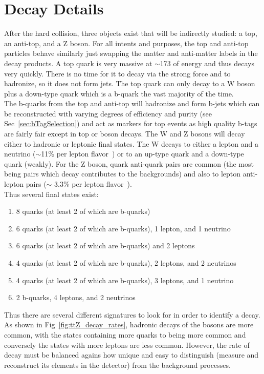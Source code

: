 	\section{\ttZ Decay Details}
	After the hard collision, three objects exist that will be indirectly studied: a top, an anti-top, and a Z boson. For all intents and purposes, the top and anti-top particles behave similarly just swapping the matter and anti-matter labels in the decay products. A top quark is very massive at $\sim$173 \GeV of energy and thus decays very quickly. There is no time for it to decay via the strong force and to hadronize, so it does not form jets. The top quark can only decay to a W boson plus a down-type quark which is a b-quark the vast majority of the time. \\
	
	The b-quarks from the top and anti-top will hadronize and form b-jets which can be reconstructed with varying degrees of efficiency and purity (see Sec~\ref{sec:bTagSelection}) and act as markers for top events as high quality b-tags are fairly fair except in top or boson decays. The W and Z bosons will decay either to hadronic or leptonic final states. The W decays to either a lepton and a neutrino ($\sim$11\% per lepton flavor~\cite{pdg}) or to an up-type quark and a down-type quark (weakly). For the Z boson, quark anti-quark pairs are common (the most being \bbbar pairs which decay contributes to the \ttZ backgrounds) and also to lepton anti-lepton pairs ($\sim$ 3.3\% per lepton flavor~\cite{pdg}).\\
	
	Thus several final states exist:
	\begin{enumerate}
	\item 8 quarks (at least 2 of which are b-quarks)
	\item 6 quarks (at least 2 of which are b-quarks), 1 lepton, and 1 neutrino
	\item 6 quarks (at least 2 of which are b-quarks) and 2 leptons
	\item 4 quarks (at least 2 of which are b-quarks), 2 leptons, and 2 neutrinos
	\item 4 quarks (at least 2 of which are b-quarks), 3 leptons, and 1 neutrino
	\item 2 b-quarks, 4 leptons, and 2 neutrinos
	\end{enumerate}
	
	Thus there are several different signatures to look for in order to identify a \ttZ decay. As shown in Fig~\ref{fig:ttZ_decay_rates}, hadronic decays of the bosons are more common, with the states containing more quarks to being more common and conversely the states with more leptons are less common. However, the rate of decay must be balanced agains how unique and easy to distinguish (measure and reconstruct its elements in the detector) from the background processes.
	
